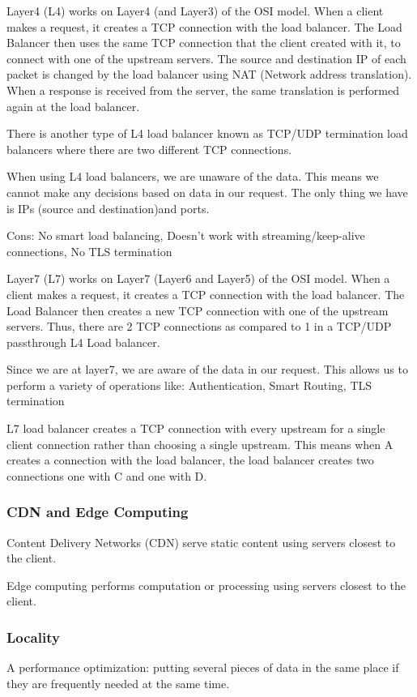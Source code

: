 \documentclass{article}
\begin{document}
    Layer4 (L4) works on Layer4 (and Layer3) of the OSI model. When a client makes a request, it creates a TCP connection with the load balancer. The Load Balancer then uses the same TCP connection that the client created with it, to connect with one of the upstream servers. The source and destination IP of each packet is changed by the load balancer using NAT (Network address translation). When a response is received from the server, the same translation is performed again at the load balancer.
    
    There is another type of L4 load balancer known as TCP/UDP termination load balancers where there are two different TCP connections.
    
    When using L4 load balancers, we are unaware of the data. This means we cannot make any decisions based on data in our request. The only thing we have is IPs (source and destination)and ports.
    
    Cons: No smart load balancing, Doesn’t work with streaming/keep-alive connections, No TLS termination

    Layer7 (L7) works on Layer7 (Layer6 and Layer5) of the OSI model. When a client makes a request, it creates a TCP connection with the load balancer. The Load Balancer then creates a new TCP connection with one of the upstream servers. Thus, there are 2 TCP connections as compared to 1 in a TCP/UDP passthrough L4 Load balancer.
    
    Since we are at layer7, we are aware of the data in our request. This allows us to perform a variety of operations like: Authentication, Smart Routing, TLS termination
    
    L7 load balancer creates a TCP connection with every upstream for a single client connection rather than choosing a single upstream. This means when A creates a connection with the load balancer, the load balancer creates two connections one with C and one with D.
    
    \subsubsection{CDN and Edge Computing}
    Content Delivery Networks (CDN) serve static content using servers closest to the client.
    
    Edge computing performs computation or processing using servers closest to the client.
    
    \subsubsection{Locality}
    A performance optimization: putting several pieces of data in the same place if they are frequently needed at the same time.
    
\end{document}
